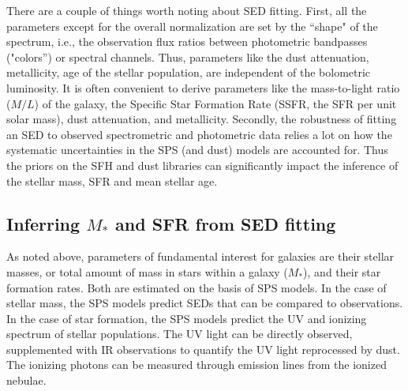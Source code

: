 There are a couple of things worth noting about SED fitting.  First,
all the parameters except for the overall normalization are set by the
``shape" of the spectrum, i.e., the observation flux ratios between
photometric bandpasses ("colors'') or spectral channels.  Thus,
parameters like the dust attenuation, metallicity, age of the stellar
population, are independent of the bolometric luminosity. It is often
convenient to derive parameters like the mass-to-light ratio ($M/L$)
of the galaxy, the Specific Star Formation Rate (SSFR, the SFR per
unit solar mass), dust attenuation, and metallicity.  Secondly, the
robustness of fitting an SED to observed spectrometric and photometric
data relies a lot on how the systematic uncertainties in the SPS (and
dust) models are accounted for. Thus the priors on the SFH and dust
libraries can significantly impact the inference of the stellar mass,
SFR and mean stellar age.\\


\subsection{Inferring $M_{*}$ and SFR from SED fitting}
\label{masses}

As noted above, parameters of fundamental interest for galaxies are
their stellar masses, or total amount of mass in stars within a galaxy
($M_\ast$), and their star formation rates. Both are estimated on the
basis of SPS models. In the case of stellar mass, the SPS models
predict SEDs that can be compared to observations. In the case of star
formation, the SPS models predict the UV and ionizing spectrum of
stellar populations. The UV light can be directly observed,
supplemented with IR observations to quantify the UV light reprocessed
by dust. The ionizing photons can be measured through emission lines
from the ionized nebulae.

